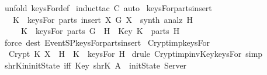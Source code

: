 \begin{isabellebody}
  \isadelimproof
  \endisadelimproof
  \isatagproof
  \isamarkupfalse%
  \ {\isacharparenleft}unfold\ keysFor{\isacharunderscore}def{\isacharparenright}\isanewline
  \isamarkupfalse%
  \ {\isacharparenleft}induct{\isacharunderscore}tac\ {\isachardoublequoteopen}C{\isachardoublequoteclose}{\isacharcomma}\ auto{\isacharparenright}\isanewline
  \isamarkupfalse%
  \endisatagproof
  {\isafoldproof}%
  \isadelimproof
  \isanewline
  \endisadelimproof
  \isanewline
  \isanewline
  \isamarkupfalse%
  \ keysFor{\isacharunderscore}parts{\isacharunderscore}insert\ {\isacharcolon}\ \isanewline
  \ \ {\isachardoublequoteopen}{\isasymlbrakk}\ K\ {\isasymin}\ keysFor\ {\isacharparenleft}parts\ {\isacharparenleft}insert\ X\ G{\isacharparenright}{\isacharparenright}{\isacharsemicolon}\ X\ {\isasymin}\ synth\ {\isacharparenleft}analz\ H{\isacharparenright}\ {\isasymrbrakk}\isanewline
  \ \ \ \ {\isasymLongrightarrow}\ K\ {\isasymin}\ keysFor\ {\isacharparenleft}parts\ {\isacharparenleft}G\ {\isasymunion}\ H{\isacharparenright}{\isacharparenright}\ {\isacharbar}\ Key\ K\ {\isasymin}\ parts\ H{\isachardoublequoteclose}\isanewline
  \isadelimproof
  \endisadelimproof
  \isatagproof
  \isamarkupfalse%
  \ {\isacharparenleft}force\ dest{\isacharcolon}\ EventSP{\isachardot}keysFor{\isacharunderscore}parts{\isacharunderscore}insert{\isacharparenright}%
  \endisatagproof
  {\isafoldproof}%
  \isadelimproof
  \isanewline
  \endisadelimproof
  \isanewline
  \isanewline
  \isamarkupfalse%
  \ Crypt{\isacharunderscore}imp{\isacharunderscore}keysFor\ {\isacharcolon}\ \isanewline
  \ \ {\isachardoublequoteopen}Crypt\ K\ X\ {\isasymin}\ H\ {\isasymLongrightarrow}\ K\ {\isasymin}\ keysFor\ H{\isachardoublequoteclose}\isanewline
  \isadelimproof
  \endisadelimproof
  \isatagproof
  \isamarkupfalse%
  \ {\isacharparenleft}drule\ Crypt{\isacharunderscore}imp{\isacharunderscore}invKey{\isacharunderscore}keysFor{\isacharcomma}\ simp{\isacharparenright}%
  \endisatagproof
  {\isafoldproof}%
  \isadelimproof
  \isanewline
  \endisadelimproof
  \isanewline
  \isanewline
  \isamarkupfalse%
  \ shrK{\isacharunderscore}in{\isacharunderscore}initState\ {\isacharbrackleft}iff{\isacharbrackright}{\isacharcolon}\ {\isachardoublequoteopen}Key\ {\isacharparenleft}shrK\ A{\isacharparenright}\ {\isasymin}\ initState\ Server{\isachardoublequoteclose}\isanewline
  \isadelimproof
  \endisadelimproof

\end{isabellebody}
